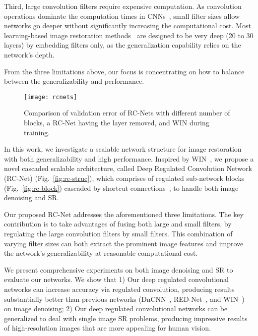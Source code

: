 \documentclass[10pt,twocolumn,letterpaper]{article}
\begin{document}
Third, large convolution filters require expensive computation. As convolution operations dominate the computation times in CNNs~\cite{he2015convolutional}, small filter sizes allow networks go deeper without significantly increasing the computational cost. Most learning-based image restoration methods~\cite{kim2016accurate,zhang2016beyond} are designed to be very deep (20 to 30 layers) by embedding  filters only, as the generalization capability relies on the network's depth. 

From the three limitations above, our focus is concentrating on how to balance between the generalizability and performance. 

\begin{figure}[t]
\label{fig:rcnets}
  \centering
  \texttt{[image: rcnets]}
  \caption{Comparison of validation error of RC-Nets with different number of blocks, a RC-Net having the  layer removed, and WIN during training.}
  \vspace{-1 em}
\end{figure} 

In this work, we investigate a scalable
network structure for image restoration with both generalizability and high performance.  Inspired by WIN~\cite{DBLP:journals/corr/LiuF17}, we propose a novel cascaded scalable architecture, called Deep Regulated Convolution Network (RC-Net) (Fig.~\ref{fig:rc-struc}), which comprises of regulated sub-network blocks (Fig.~\ref{fig:rc-block}) cascaded by shortcut connections~\cite{he2016deep}, to handle both image denoising and SR.

Our proposed RC-Net addresses the aforementioned three limitations. The key contribution is to take advantages  of fusing both large and small filters, by regulating the large convolution filters by small filters. This combination of varying filter sizes can both extract the prominent image features and improve the network's generalizability at reasonable computational cost.





We present comprehensive experiments on both image denoising and SR to evaluate our networks. We show that 1) Our deep regulated convolutional networks can increase
accuracy via regulated convolution, producing results
substantially better than previous networks (DnCNN~\cite{zhang2016beyond}, RED-Net~\cite{mao2016image}, and WIN~\cite{DBLP:journals/corr/LiuF17}) on image denoising; 2) Our deep regulated convolutional networks can be generalized to deal with single image SR problems, producing impressive results of high-resolution images that are more appealing for human vision. 
\end{document}
